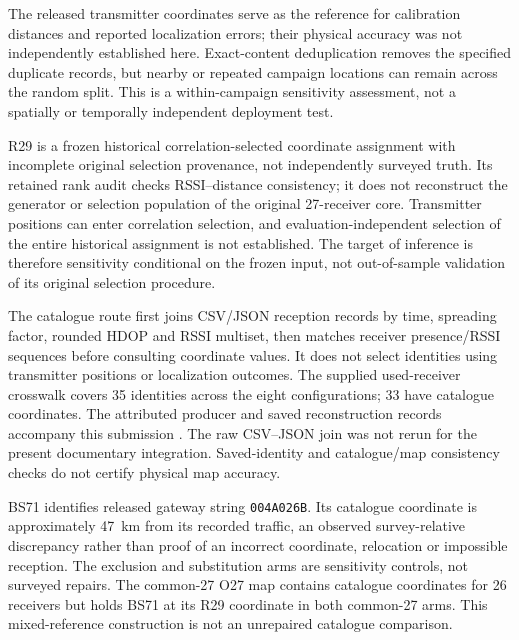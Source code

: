 \documentclass[11pt,a4paper]{article}
\begin{document}
The released transmitter coordinates serve as the reference for calibration distances and reported localization errors; their physical accuracy was not independently established here. Exact-content deduplication removes the specified duplicate records, but nearby or repeated campaign locations can remain across the random split. This is a within-campaign sensitivity assessment, not a spatially or temporally independent deployment test.

R29 is a frozen historical correlation-selected coordinate assignment with incomplete original selection provenance, not independently surveyed truth. Its retained rank audit checks RSSI--distance consistency; it does not reconstruct the generator or selection population of the original 27-receiver core. Transmitter positions can enter correlation selection, and evaluation-independent selection of the entire historical assignment is not established. The target of inference is therefore sensitivity conditional on the frozen input, not out-of-sample validation of its original selection procedure.

The catalogue route first joins CSV/JSON reception records by time, spreading factor, rounded HDOP and RSSI multiset, then matches receiver presence/RSSI sequences before consulting coordinate values. It does not select identities using transmitter positions or localization outcomes. The supplied used-receiver crosswalk covers 35 identities across the eight configurations; 33 have catalogue coordinates. The attributed producer and saved reconstruction records accompany this submission \cite{ref15}. The raw CSV--JSON join was not rerun for the present documentary integration. Saved-identity and catalogue/map consistency checks do not certify physical map accuracy.

BS71 identifies released gateway string \texttt{004A026B}. Its catalogue coordinate is approximately 47~km from its recorded traffic, an observed survey-relative discrepancy rather than proof of an incorrect coordinate, relocation or impossible reception. The exclusion and substitution arms are sensitivity controls, not surveyed repairs. The common-27 O27 map contains catalogue coordinates for 26 receivers but holds BS71 at its R29 coordinate in both common-27 arms. This mixed-reference construction is not an unrepaired catalogue comparison.
\end{document}
